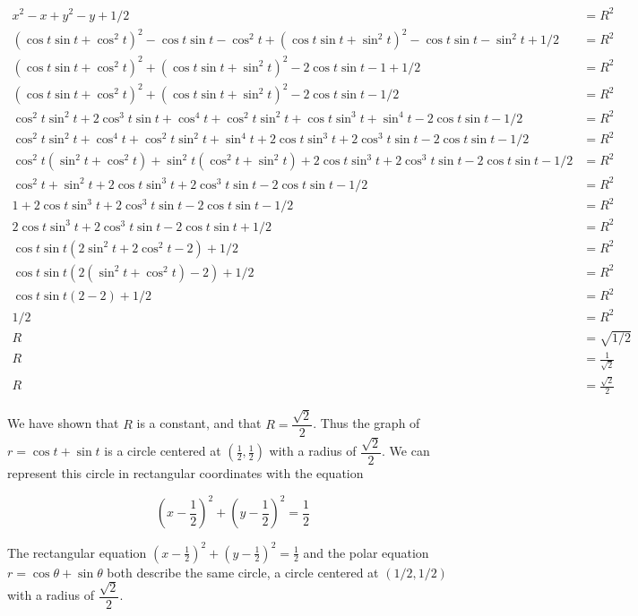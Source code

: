 \begin{align*}
x^2 - x + y^2 - y + 1/2 &= R^2 \\
(\cos t \sin t + \cos^2 t)^2 - \cos t \sin t - \cos^2 t + (\cos t \sin t + \sin^2 t)^2 - \cos t \sin t - \sin^2 t + 1/2 &= R^2 \\
(\cos t \sin t + \cos^2 t)^2 + (\cos t \sin t + \sin^2 t)^2 - 2\cos t \sin t - 1 + 1/2 &= R^2 \\
(\cos t \sin t + \cos^2 t)^2 + (\cos t \sin t + \sin^2 t)^2 - 2\cos t \sin t - 1/2 &= R^2 \\
\cos^2 t \sin^2 t + 2 \cos^3 t \sin t + \cos^4 t + \cos^2 t \sin^2 t + \cos t \sin^3 t + \sin^4 t - 2\cos t \sin t - 1/2 &= R^2 \\
\cos^2 t \sin^2 t + \cos^4 t + \cos^2 t \sin^2 t + \sin^4 t + 2\cos t \sin^3 t + 2 \cos^3 t \sin t - 2\cos t \sin t - 1/2 &= R^2 \\
\cos^2 t (\sin^2 t + \cos^2 t) + \sin^2 t(\cos^2 t + \sin^2 t) + 2\cos t \sin^3 t + 2 \cos^3 t \sin t - 2\cos t \sin t - 1/2 &= R^2 \\
\cos^2 t + \sin^2 t + 2\cos t \sin^3 t + 2 \cos^3 t \sin t - 2\cos t \sin t - 1/2 &= R^2 \\
1 + 2\cos t \sin^3 t + 2 \cos^3 t \sin t - 2\cos t \sin t - 1/2 &= R^2 \\
2\cos t \sin^3 t + 2 \cos^3 t \sin t - 2\cos t \sin t + 1/2 &= R^2 \\
\cos t \sin t (2\sin^2 t + 2 \cos^2 t - 2) + 1/2 &= R^2 \\
\cos t \sin t (2(\sin^2 t + \cos^2 t) - 2) + 1/2 &= R^2 \\
\cos t \sin t (2 - 2) + 1/2 &= R^2 \\
1/2 &= R^2 \\
R &= \sqrt{1/2} \\
R &= \frac{1}{\sqrt 2} \\
R &= \frac{\sqrt 2}{2}
\end{align*}

We have shown that $R$ is a constant, and that $R = \dfrac{\sqrt 2}{2}$. Thus the graph of $r = \cos t + \sin t$ is a circle centered at $\displaystyle \left(\frac{1}{2}, \frac{1}{2}\right)$ with a radius of $\dfrac{\sqrt 2}{2}$. We can represent this circle in rectangular coordinates with the equation

$$ \left(x - \frac{1}{2}\right)^2 + \left(y - \frac{1}{2}\right)^2 = \frac{1}{2} $$

The rectangular equation $\displaystyle \left(x - \frac{1}{2}\right)^2 + \left(y - \frac{1}{2}\right)^2 = \frac{1}{2}$ and the polar equation $r = \cos \theta + \sin \theta$ both describe the same circle, a circle centered at $(1/2, 1/2)$ with a radius of $\dfrac{\sqrt 2}{2}$.
